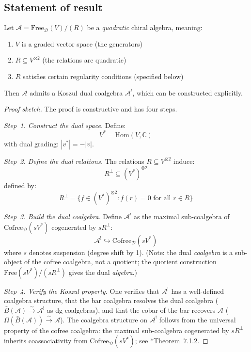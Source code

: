 \subsection{Statement of result}

\begin{theorem}\label{thm:quadratic-have-duals}
Let $\mathcal{A} = \text{Free}_{\mathcal{D}}(V) / (R)$ be a \emph{quadratic} 
chiral algebra, meaning:
\begin{enumerate}
\item $V$ is a graded vector space (the generators)
\item $R \subseteq V^{\otimes 2}$ (the relations are quadratic)
\item $R$ satisfies certain regularity conditions (specified below)
\end{enumerate}

Then $\mathcal{A}$ admits a Koszul dual coalgebra $\mathcal{A}^!$, which can be 
constructed explicitly.
\end{theorem}

\begin{proof}[Proof sketch]
The proof is constructive and has four steps.

\emph{Step~1. Construct the dual space.}
Define:
\[V^* = \text{Hom}(V, \mathbb{C})\]
with dual grading: $|v^*| = -|v|$.

\emph{Step~2. Define the dual relations.}
The relations $R \subseteq V^{\otimes 2}$ induce:
\[R^\perp \subseteq (V^*)^{\otimes 2}\]
defined by:
\[R^\perp = \{f \in (V^*)^{\otimes 2} : f(r) = 0 \text{ for all } r \in R\}\]

\emph{Step~3. Build the dual coalgebra.}
Define $\mathcal{A}^!$ as the maximal sub-coalgebra of $\text{Cofree}_{\mathcal{D}}(sV^*)$ cogenerated by $sR^\perp$:
\[\mathcal{A}^! \hookrightarrow \text{Cofree}_{\mathcal{D}}(sV^*)\]
where $s$ denotes suspension (degree shift by 1).  (Note: the dual \emph{coalgebra} is a sub-object of the cofree coalgebra, not a quotient; the quotient construction $\text{Free}(sV^*)/(sR^\perp)$ gives the dual \emph{algebra}.)

\emph{Step~4. Verify the Koszul property.}
One verifies that $\mathcal{A}^!$ has a well-defined coalgebra structure, that the bar coalgebra resolves the dual coalgebra ($\bar{B}(\mathcal{A}) \xrightarrow{\sim} \mathcal{A}^!$ as dg coalgebras), and that the cobar of the bar recovers $\mathcal{A}$ ($\Omega(\bar{B}(\mathcal{A})) \xrightarrow{\sim} \mathcal{A}$).  The coalgebra structure on $\mathcal{A}^!$ follows from the universal property of the cofree coalgebra: the maximal sub-coalgebra cogenerated by $sR^\perp$ inherits coassociativity from $\text{Cofree}_{\mathcal{D}}(sV^*)$; see \cite{LV12}*{Theorem~7.1.2}.
\end{proof}

